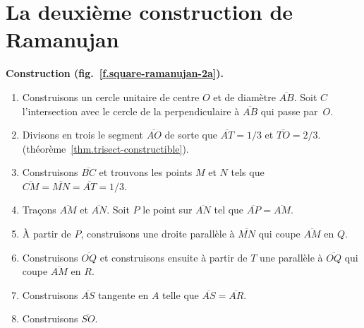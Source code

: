 \section{La deuxième construction de Ramanujan}\label{s.square-ramanujan-second}


\textbf{Construction  (fig.~\ref{f.square-ramanujan-2a}).}
\begin{enumerate}

\item Construisons un cercle unitaire de centre $O$ et de diamètre $\overline{AB}$. Soit $C$ l'intersection avec le cercle de la perpendiculaire à $\overline{AB}$ qui passe par~$O$.

\item Divisons en trois le segment  $\overline{AO}$ de sorte que $\overline{AT}=1/3$ et $\overline{TO}=2/3$. (théorème~\ref{thm.trisect-constructible}).

\item Construisons $\overline{BC}$ et trouvons les points $M$ et $N$ tels que $\overline{CM}=\overline{MN}=\overline{AT}=1/3$.

\item Traçons $\overline{AM}$ et $\overline{AN}$. Soit $P$  le point sur $\overline{AN}$ tel que $\overline{AP}=\overline{AM}$.

\item À partir de $P$, construisons une droite parallèle à $\overline{MN}$ qui coupe $\overline{AM}$ en $Q$.

\item Construisons $\overline{OQ}$ et construisons  ensuite à partir de $T$ une parallèle à $\overline{OQ}$ qui coupe $\overline{AM}$ en $R$.

\item Construisons $\overline{AS}$ tangente en $A$ telle que $\overline{AS}=\overline{AR}$.

\item Construisons $\overline{SO}$.
\end{enumerate}

